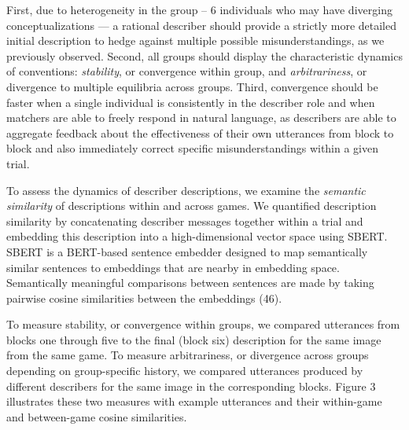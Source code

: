 \documentclass[9pt,twocolumn,twoside]{pnas-new}
\begin{document}
First, due to heterogeneity in the group -- 6 individuals who may have
diverging conceptualizations --- a rational describer should provide a
strictly more detailed initial description to hedge against multiple
possible misunderstandings, as we previously observed. Second, all
groups should display the characteristic dynamics of conventions:
\emph{stability}, or convergence within group, and \emph{arbitrariness},
or divergence to multiple equilibria across groups. Third, convergence
should be faster when a single individual is consistently in the
describer role and when matchers are able to freely respond in natural
language, as describers are able to aggregate feedback about the
effectiveness of their own utterances from block to block and also
immediately correct specific misunderstandings within a given trial.

To assess the dynamics of describer descriptions, we examine the
\emph{semantic similarity} of descriptions within and across games. We
quantified description similarity by concatenating describer messages
together within a trial and embedding this description into a
high-dimensional vector space using SBERT. SBERT is a BERT-based
sentence embedder designed to map semantically similar sentences to
embeddings that are nearby in embedding space. Semantically meaningful
comparisons between sentences are made by taking pairwise cosine
similarities between the embeddings (46).

To measure stability, or convergence within groups, we compared
utterances from blocks one through five to the final (block six)
description for the same image from the same game. To measure
arbitrariness, or divergence across groups depending on group-specific
history, we compared utterances produced by different describers for the
same image in the corresponding blocks. Figure 3
illustrates these two measures with example utterances and their
within-game and between-game cosine similarities.
\end{document}
